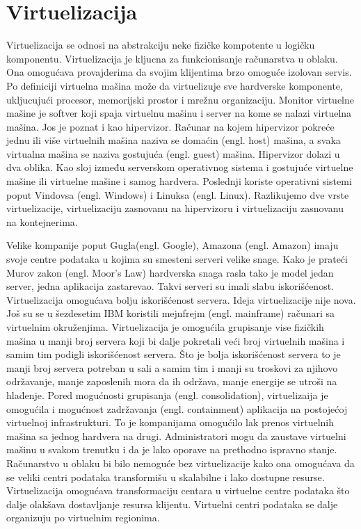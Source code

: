 \documentclass[12pt,oneside]{memoir}
\begin{document}


\section{Virtuelizacija}
Virtuelizacija se odnosi na abstrakciju neke fizičke kompotente u logičku komponentu. Virtuelizacija je kljucna za funkcionisanje računarstva u oblaku. Ona omogućava provajderima da svojim klijentima brzo omoguće izolovan servis. Po definiciji virtuelna mašina može da virtuelizuje sve hardverske komponente, ukljucujući procesor, memorijski prostor i mrežnu organizaciju\cite{ve}. Monitor virtuelne mašine je softver koji spaja virtuelnu mašinu i server na kome se nalazi virtuelna mašina. Jos je poznat i kao hipervizor. Računar na kojem hipervizor pokreće jednu ili više virtuelnih mašina naziva se domaćin (engl. host) mašina, a svaka virtualna mašina se naziva gostujuća (engl. guest) mašina. Hipervizor dolazi u dva oblika. Kao sloj između serverskom operativnog sistema i gostujuće virtuelne mašine ili virtuelne mašine i samog hardvera\cite{ve}. Poslednji koriste operativni sistemi poput Vindovsa (engl. Windows) i Linuksa (engl. Linux). Razlikujemo dve vrste virtuelizacije, virtuelizaciju zasnovanu na hipervizoru i virtuelizaciju zasnovanu na kontejnerima.
 
Velike kompanije poput Gugla(engl. Google), Amazona (engl. Amazon) imaju svoje centre podataka u kojima su smesteni serveri velike snage. Kako je prateći Murov zakon (engl. Moor's Law) hardverska snaga rasla tako je model jedan server, jedna aplikacija zastarevao. Takvi serveri su imali slabu iskorišćenost. Virtuelizacija omogućava bolju iskorišćenost servera. Ideja virtuelizacije nije nova. Još su se u šezdesetim IBM koristili mejnfrejm (engl. mainframe) računari sa virtuelnim okruženjima. Virtuelizacija je omogućila grupisanje vise fizičkih mašina u manji broj servera koji bi dalje pokretali veći broj virtuelnih mašina i samim tim podigli iskorišćenost servera. Što je bolja iskorišćenost servera to je manji broj servera potreban u sali a samim tim i manji su troskovi za njihovo održavanje, manje zaposlenih mora da ih održava, manje energije se utroši na hlađenje. Pored mogućnosti grupisanja (engl. consolidation), virtuelizaija je omogućila i mogućnost zadržavanja (engl. containment) aplikacija na postojećoj virtuelnoj infrastrukturi. To je kompanijama omogućilo lak prenos virtuelnih mašina sa jednog hardvera na drugi. Administratori mogu da zaustave virtuelni mašinu u svakom trenutku i da je lako oporave na prethodno ispravno stanje. Računarstvo u oblaku bi bilo nemoguće bez virtuelizacije kako ona omogućava da se veliki centri podataka transformišu u skalabilne i lako dostupne resurse. Virtuelizacija omogućava transformaciju centara u virtuelne centre podataka što dalje olakšava dostavljanje resursa klijentu. Virtuelni centri podataka se dalje organizuju po virtuelnim regionima\cite{ve}.
\end{document}
